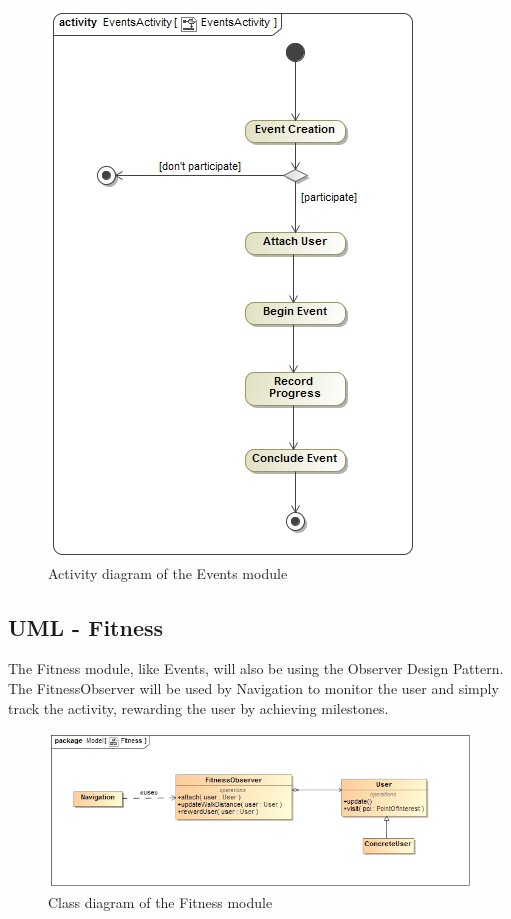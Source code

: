 \documentclass[12pt,a4paper]{article}
\begin{document}
	\begin{figure}
		\includegraphics[width=\linewidth]{Images/EventsActivity.jpg}
		\caption{Activity diagram of the Events module}
	\end{figure}
	
	\subsection{UML - Fitness}
	The Fitness module, like Events, will also be using the Observer Design Pattern. The FitnessObserver will be used by Navigation to monitor the user and simply track the activity, rewarding the user by achieving milestones.
	\begin{figure}
		\includegraphics[width=\linewidth]{Images/Fitness.jpg}
		\caption{Class diagram of the Fitness module}
	\end{figure}
	
\end{document}
